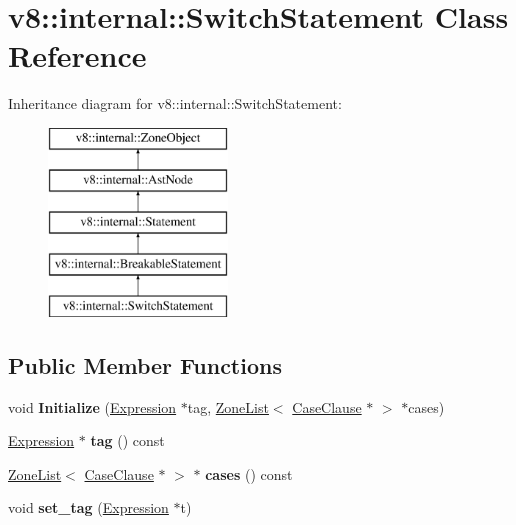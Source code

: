 \hypertarget{classv8_1_1internal_1_1_switch_statement}{}\section{v8\+:\+:internal\+:\+:Switch\+Statement Class Reference}
\label{classv8_1_1internal_1_1_switch_statement}
Inheritance diagram for v8\+:\+:internal\+:\+:Switch\+Statement\+:\begin{figure}[H]
\begin{center}
\leavevmode
\includegraphics[height=5.000000cm]{classv8_1_1internal_1_1_switch_statement}
\end{center}
\end{figure}
\subsection*{Public Member Functions}
\begin{DoxyCompactItemize}
\item 
void {\bfseries Initialize} (\hyperlink{classv8_1_1internal_1_1_expression}{Expression} $\ast$tag, \hyperlink{classv8_1_1internal_1_1_zone_list}{Zone\+List}$<$ \hyperlink{classv8_1_1internal_1_1_case_clause}{Case\+Clause} $\ast$ $>$ $\ast$cases)\hypertarget{classv8_1_1internal_1_1_switch_statement_a14e868e13a5def707610b5d096d92ffa}{}\label{classv8_1_1internal_1_1_switch_statement_a14e868e13a5def707610b5d096d92ffa}

\item 
\hyperlink{classv8_1_1internal_1_1_expression}{Expression} $\ast$ {\bfseries tag} () const \hypertarget{classv8_1_1internal_1_1_switch_statement_a8e51c9c9bb55e22b3cde40a8730c4915}{}\label{classv8_1_1internal_1_1_switch_statement_a8e51c9c9bb55e22b3cde40a8730c4915}

\item 
\hyperlink{classv8_1_1internal_1_1_zone_list}{Zone\+List}$<$ \hyperlink{classv8_1_1internal_1_1_case_clause}{Case\+Clause} $\ast$ $>$ $\ast$ {\bfseries cases} () const \hypertarget{classv8_1_1internal_1_1_switch_statement_a874cfc0823173c846c668f7a83580784}{}\label{classv8_1_1internal_1_1_switch_statement_a874cfc0823173c846c668f7a83580784}

\item 
void {\bfseries set\+\_\+tag} (\hyperlink{classv8_1_1internal_1_1_expression}{Expression} $\ast$t)\hypertarget{classv8_1_1internal_1_1_switch_statement_a4562fa4198dd3a8498360c65659ffd28}{}\label{classv8_1_1internal_1_1_switch_statement_a4562fa4198dd3a8498360c65659ffd28}

\end{DoxyCompactItemize}
